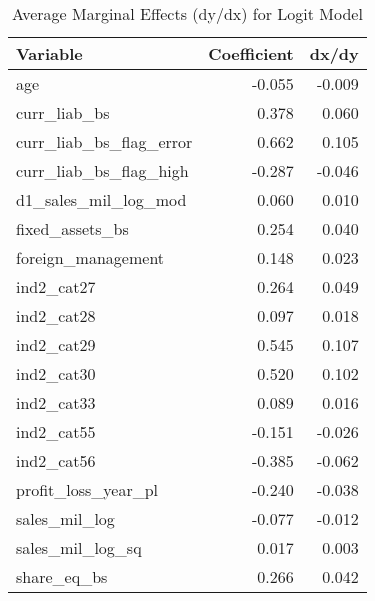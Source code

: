 \begin{table}

\caption{\label{tab:vars}Average Marginal Effects (dy/dx) for Logit Model}
\centering
\begin{tabular}[t]{l|r|r}
\hline
Variable & Coefficient & dx/dy\\
\hline
age & -0.055 & -0.009\\
\hline
curr\_liab\_bs & 0.378 & 0.060\\
\hline
curr\_liab\_bs\_flag\_error & 0.662 & 0.105\\
\hline
curr\_liab\_bs\_flag\_high & -0.287 & -0.046\\
\hline
d1\_sales\_mil\_log\_mod & 0.060 & 0.010\\
\hline
fixed\_assets\_bs & 0.254 & 0.040\\
\hline
foreign\_management & 0.148 & 0.023\\
\hline
ind2\_cat27 & 0.264 & 0.049\\
\hline
ind2\_cat28 & 0.097 & 0.018\\
\hline
ind2\_cat29 & 0.545 & 0.107\\
\hline
ind2\_cat30 & 0.520 & 0.102\\
\hline
ind2\_cat33 & 0.089 & 0.016\\
\hline
ind2\_cat55 & -0.151 & -0.026\\
\hline
ind2\_cat56 & -0.385 & -0.062\\
\hline
profit\_loss\_year\_pl & -0.240 & -0.038\\
\hline
sales\_mil\_log & -0.077 & -0.012\\
\hline
sales\_mil\_log\_sq & 0.017 & 0.003\\
\hline
share\_eq\_bs & 0.266 & 0.042\\
\hline
\end{tabular}
\end{table}